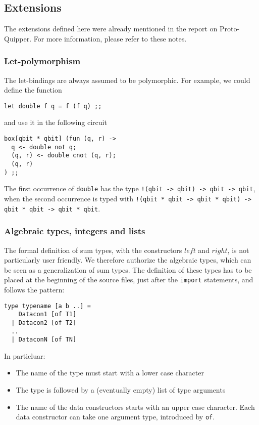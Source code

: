 \subsection{Extensions}

The extensions defined here were already mentioned in the report on Proto-Quipper. For more information, please refer to these notes.

\subsubsection{Let-polymorphism}

The let-bindings are always assumed to be polymorphic. For example, we could define the function
\begin{verbatim}
let double f q = f (f q) ;;
\end{verbatim}
and use it in the following circuit
\begin{verbatim}
box[qbit * qbit] (fun (q, r) ->
  q <- double not q;
  (q, r) <- double cnot (q, r);
  (q, r)
) ;;
\end{verbatim}
The first occurrence of \verb#double# has the type \verb#!(qbit -> qbit) -> qbit -> qbit#, when the second occurrence is typed with
\verb#!(qbit * qbit -> qbit * qbit) -> qbit * qbit -> qbit * qbit#.

\subsubsection{Algebraic types, integers and lists}

The formal definition of sum types, with the constructors $left$ and $right$, is not particularly user friendly. We therefore authorize
the algebraic types, which can be seen as a generalization of sum types.
The definition of these types has to be placed at the beginning of the source files, just after the \verb#import# statements, and follows the
pattern:
\begin{verbatim}
type typename [a b ..] =
    Datacon1 [of T1]
  | Datacon2 [of T2]
  ..
  | DataconN [of TN]
\end{verbatim}
In particluar:
\begin{itemize}
	\item The name of the type must start with a lower case character
	\item The type is followed by a (eventually empty) list of type arguments
	\item The name of the data constructors starts with an upper case character. Each data constructor can take one argument type, introduced
		by \verb#of#.
\end{itemize}

